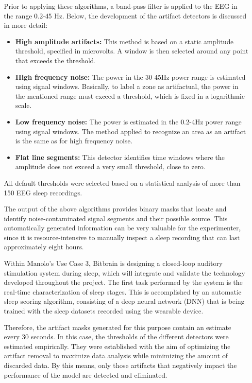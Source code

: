 Prior to applying these algorithms, a band-pass filter is applied to the EEG in the range 0.2-45 Hz. Below, the development of the artifact detectors is discussed in more detail: 
\begin{itemize}
    \item \textbf{High amplitude artifacts:} This method is based on a static amplitude threshold, specified in microvolts. A window is then selected around any point that exceeds the threshold. 
    \vspace{-0.2cm}
    \item \textbf{High frequency noise:} The power in the 30-45Hz power range is estimated using signal windows. Basically, to label a zone as artifactual, the power in the mentioned range must exceed a threshold, which is fixed in a logarithmic scale. 
    \vspace{-0.2cm}
    \item \textbf{Low frequency noise:} The power is estimated in the 0.2-4Hz power range using signal windows. The method applied to recognize an area as an artifact is the same as for high frequency noise. 
    \vspace{-0.2cm}
    \item \textbf{Flat line segments:} This detector identifies time windows where the amplitude does not exceed a very small threshold, close to zero. 
\end{itemize}
All default thresholds were selected based on a statistical analysis of more than 150 EEG sleep recordings. 

The output of the above algorithms provides binary masks that locate and identify noise-contaminated signal segments and their possible source. This automatically generated information can be very valuable for the experimenter, since it is resource-intensive to manually inspect a sleep recording that can last approximately eight hours. 

Within Manolo's Use Case 3, Bitbrain is designing a closed-loop auditory stimulation system during sleep, which will integrate and validate the technology developed throughout the project. The first task performed by the system is the real-time characterization of sleep stages. This is accomplished by an automatic sleep scoring algorithm, consisting of a deep neural network (DNN) that is being trained with the sleep datasets recorded using the wearable device.  

Therefore, the artifact masks generated for this purpose contain an estimate every 30 seconds. In this case, the thresholds of the different detectors were estimated empirically. They were established with the aim of optimizing the artifact removal to maximize data analysis while minimizing the amount of discarded data. By this means, only those artifacts that negatively impact the performance of the model are detected and eliminated.

